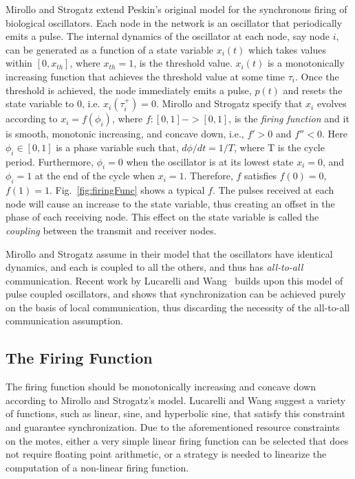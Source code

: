 Mirollo and Strogatz extend Peskin's original model for the synchronous
firing of biological oscillators.  Each node in the network is an oscillator
that periodically emits a pulse.  The internal dynamics of the oscillator at
each node, say node $i$, can be generated as a function of a state variable
$x_i(t)$ which takes values within $[0,x_{th}]$, where $x_{th}=1$, is the
threshold value. $x_i(t)$ is a monotonically increasing function that
achieves the threshold value at some time $\tau_i$. Once the threshold is
achieved, the node immediately emits a pulse, $p(t)$ and resets the state
variable to 0, i.e. $x_i(\tau_i^+)=0$.  Mirollo and Strogatz specify that
$x_i$ evolves according to $x_i=f(\phi_i)$, where $f:[0,1]->[0,1]$, is
the \emph{firing function} and it is smooth, monotonic increasing, 
and concave down, i.e., $f'>0$ and $f''<0$.
Here $\phi_i \in [0,1]$ is a phase variable such that, $d\phi / dt = 1/T$,
where T is the cycle period. Furthermore, $\phi_i=0$ when the oscillator is
at its lowest state $x_i=0$, and $\phi_i=1$ at the end of the cycle when
$x_i=1$. Therefore, $f$ satisfies $f(0)=0$, $f(1)=1$.
Fig.~\ref{fig:firingFunc} shows a typical $f$.  The pulses received at each
node will cause an increase to the state variable, thus creating an offset in
the phase of each receiving node.  This effect on the state variable is
called the \emph{coupling} between the transmit and receiver nodes.

Mirollo and Strogatz assume in their model that the oscillators have
identical dynamics, and each is coupled to all the others, and thus has
\emph{all-to-all} communication.  Recent work by Lucarelli and
Wang~\cite{lw04} builds upon this model of pulse coupled oscillators, and
shows that synchronization can be achieved purely on the basis of local
communication, thus discarding the necessity of the all-to-all communication
assumption.


\subsection{The Firing Function}
\label{sec:firingFunc}

The firing function should be monotonically increasing and concave down
according to Mirollo and Strogatz's model.  
Lucarelli and Wang suggest a variety of functions, such as linear, sine, and hyperbolic sine,  
that satisfy this constraint and guarantee synchronization.
Due to the aforementioned resource constraints on the motes, either a very simple linear firing function 
can be selected that does not require floating point arithmetic, or a strategy
is needed to linearize the computation of a non-linear firing function.

